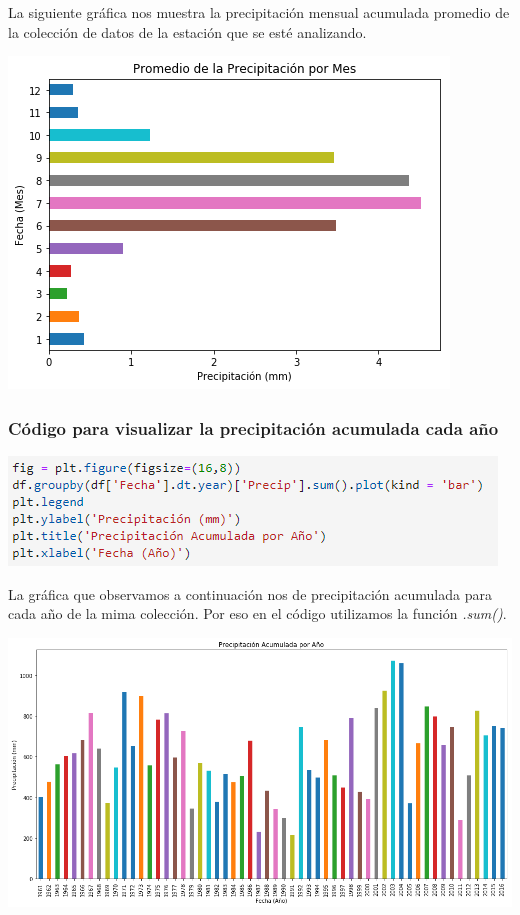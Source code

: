 \documentclass{article}
\begin{document}
La siguiente gráfica nos muestra la precipitación mensual acumulada promedio de la colección de datos de la estación que se esté analizando.

\begin{center}
    \includegraphics[scale = 0.75]{Precip.png}
\end{center}
\subsubsection{Código para visualizar la precipitación acumulada cada año}
\begin{center}
    \includegraphics[scale = 0.9]{CPrecipY.png}
\end{center}
La gráfica que observamos a continuación nos de precipitación acumulada para cada año de la mima colección. Por eso en el código utilizamos la función \textit{.sum()}.
\begin{center}
    \includegraphics[scale = 0.474]{PrecipY.png}
\end{center}
\end{document}
